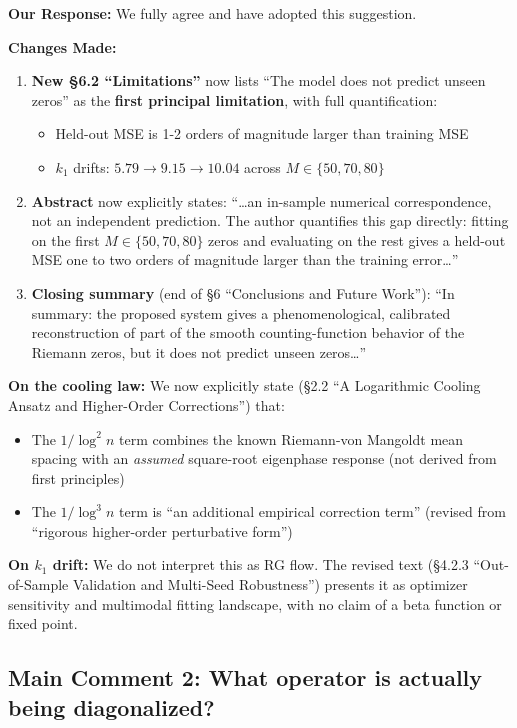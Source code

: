 \documentclass[11pt]{article}
\begin{document}
\noindent\textbf{Our Response:} We fully agree and have adopted this suggestion.

\noindent\textbf{Changes Made:}
\begin{enumerate}
\item \textbf{New \S6.2 ``Limitations''} now lists ``The model does not predict unseen zeros'' as the \textbf{first principal limitation}, with full quantification:
\begin{itemize}
\item Held-out MSE is 1-2 orders of magnitude larger than training MSE
\item $k_1$ drifts: $5.79 \to 9.15 \to 10.04$ across $M \in \{50,70,80\}$
\end{itemize}
\item \textbf{Abstract} now explicitly states: ``\ldots an in-sample numerical correspondence, not an independent prediction. The author quantifies this gap directly: fitting on the first $M\in\{50,70,80\}$ zeros and evaluating on the rest gives a held-out MSE one to two orders of magnitude larger than the training error\ldots''
\item \textbf{Closing summary} (end of \S6 ``Conclusions and Future Work''): ``In summary: the proposed system gives a phenomenological, calibrated reconstruction of part of the smooth counting-function behavior of the Riemann zeros, but it does not predict unseen zeros\ldots''
\end{enumerate}

\noindent\textbf{On the cooling law:} We now explicitly state (\S2.2 ``A Logarithmic Cooling Ansatz and Higher-Order Corrections'') that:
\begin{itemize}
\item The $1/\log^2 n$ term combines the known Riemann-von Mangoldt mean spacing with an \emph{assumed} square-root eigenphase response (not derived from first principles)
\item The $1/\log^3 n$ term is ``an additional empirical correction term'' (revised from ``rigorous higher-order perturbative form'')
\end{itemize}

\noindent\textbf{On $k_1$ drift:} We do not interpret this as RG flow. The revised text (\S4.2.3 ``Out-of-Sample Validation and Multi-Seed Robustness'') presents it as optimizer sensitivity and multimodal fitting landscape, with no claim of a beta function or fixed point.

\subsection*{Main Comment 2: What operator is actually being diagonalized?}
\end{document}
